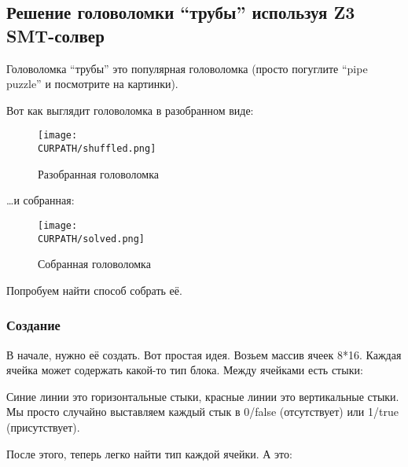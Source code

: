 \subsection{Решение головоломки ``трубы'' используя Z3 SMT-солвер}

\renewcommand{\CURPATH}{puzzles/pipe}

Головоломка ``трубы'' это популярная головоломка (просто погуглите ``pipe puzzle'' и посмотрите на картинки).

Вот как выглядит головоломка в разобранном виде:

\begin{figure}[H]
\label{fig:pipe_shuffled}
\centering
\texttt{[image: \\CURPATH/shuffled.png]}
\caption{Разобранная головоломка}
\end{figure}

\dots и собранная:

\begin{figure}[H]
\label{fig:pipe_solved}
\centering
\texttt{[image: \\CURPATH/solved.png]}
\caption{Собранная головоломка}
\end{figure}

Попробуем найти способ собрать её.

\subsubsection{Создание}

В начале, нужно её создать.
Вот простая идея.
Возьем массив ячеек 8*16.
Каждая ячейка может содержать какой-то тип блока.
Между ячейками есть стыки:



Синие линии это горизонтальные стыки, красные линии это вертикальные стыки.
Мы просто случайно выставляем каждый стык в 0/false (отсутствует) или 1/true (присутствует).

После этого, теперь легко найти тип каждой ячейки.
А это:

